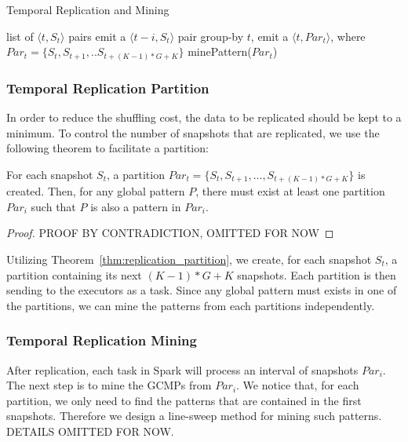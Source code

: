 \begin{algorithm}
\caption{Temporal Replication and Mining}
\label{algo:trm_overview}
\begin{algorithmic}
\Require list of $\langle t, S_t \rangle$ pairs
		\State emit a $\langle t-i, S_t \rangle$ pair
	\EndFor 
\EndFor
{}
\State group-by $t$, emit a $\langle t, Par_t\rangle$,
\State  where $Par_t = \{S_t, S_{t+1}, .. S_{t+(K-1)*G+K}\} $
\EndFor
{}
\State minePattern($Par_t$)
\EndFor

\end{algorithmic}
\end{algorithm}


\subsubsection{Temporal Replication Partition}
In order to reduce the shuffling cost, the data to be replicated should be
kept to a minimum. To control the number of snapshots that are replicated, 
we use the following theorem to facilitate a partition:

\begin{theorem}
\label{thm:replication_partition}
For each snapshot $S_t$, a partition $Par_t = \{S_t, S_{t+1},...,S_{t+(K-1)*G+K}\}$ 
is created. Then, for any global pattern $P$, there must exist at least one partition $Par_i$
such that $P$ is also a pattern in $Par_i$.
\end{theorem}
\begin{proof}
PROOF BY CONTRADICTION, OMITTED FOR NOW
\end{proof}

Utilizing Theorem~\ref{thm:replication_partition}, we create, for each snapshot $S_t$, 
a partition containing its next $(K-1)*G+K$ snapshots. Each partition is then
sending to the executors as a task. Since any global pattern must exists in 
one of the partitions, we can mine the patterns from each partitions independently.

\subsubsection{Temporal Replication Mining}
After replication, each task in Spark will process an interval of snapshots $Par_i$. The next
step is to mine the GCMPs from $Par_i$. We notice that, for each 
partition, we only need to find the patterns that
are contained in the first snapshots. Therefore we design a line-sweep method for mining 
such patterns. DETAILS OMITTED FOR NOW.


